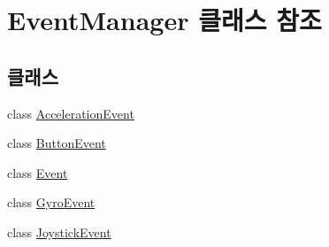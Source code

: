 \hypertarget{class_event_manager}{}\section{Event\+Manager 클래스 참조}
\label{class_event_manager}
\subsection*{클래스}
\begin{DoxyCompactItemize}
\item 
class \hyperlink{class_event_manager_1_1_acceleration_event}{Acceleration\+Event}
\item 
class \hyperlink{class_event_manager_1_1_button_event}{Button\+Event}
\item 
class \hyperlink{class_event_manager_1_1_event}{Event}
\item 
class \hyperlink{class_event_manager_1_1_gyro_event}{Gyro\+Event}
\item 
class \hyperlink{class_event_manager_1_1_joystick_event}{Joystick\+Event}
\end{DoxyCompactItemize}
